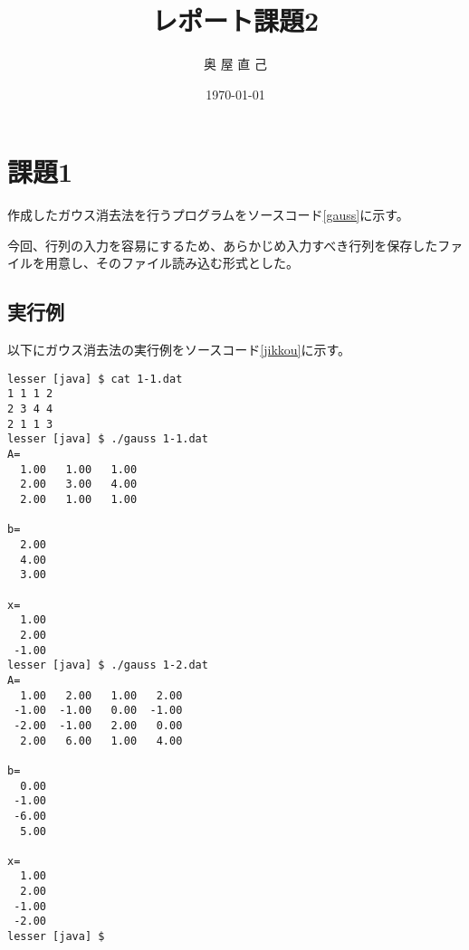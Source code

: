 \documentclass{jsarticle}
\title{レポート課題2}
\date{\today}
\author{奥 屋 直 己}
\begin{document}
\maketitle

\section{課題1}
作成したガウス消去法を行うプログラムをソースコード\ref{gauss}に示す。

今回、行列の入力を容易にするため、あらかじめ入力すべき行列を保存したファイルを用意し、そのファイル読み込む形式とした。
\subsection{実行例}
以下にガウス消去法の実行例をソースコード\ref{jikkou}に示す。
\begin{lstlisting}[caption=実行結果,label=jikkou]
lesser [java] $ cat 1-1.dat
1 1 1 2
2 3 4 4
2 1 1 3
lesser [java] $ ./gauss 1-1.dat
A=
  1.00   1.00   1.00 
  2.00   3.00   4.00 
  2.00   1.00   1.00 

b=
  2.00
  4.00
  3.00

x=
  1.00
  2.00
 -1.00
lesser [java] $ ./gauss 1-2.dat 
A=
  1.00   2.00   1.00   2.00 
 -1.00  -1.00   0.00  -1.00 
 -2.00  -1.00   2.00   0.00 
  2.00   6.00   1.00   4.00 

b=
  0.00
 -1.00
 -6.00
  5.00

x=
  1.00
  2.00
 -1.00
 -2.00
lesser [java] $ 
\end{lstlisting}
\end{document}
